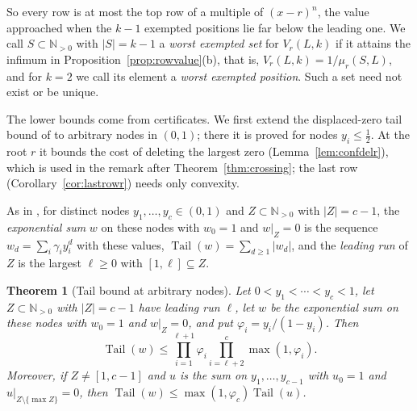 \documentclass[11pt]{article}
\newtheorem{theorem}{Theorem}[section]
\newcommand{\N}{\mathbb N}
\DeclareMathOperator{\Tail}{Tail}
\begin{document}
So every row is at most the top row of a multiple of $(x-r)^n$, the value
approached when the $k-1$ exempted positions lie far below the leading one.
We call $S\subset\N_{>0}$ with $|S|=k-1$ a \emph{worst exempted set} for
$V_r(L,k)$ if it attains the infimum in Proposition~\ref{prop:rowvalue}(b), that is,
$V_r(L,k)=1/\mu_r(S,L)$, and for $k=2$ we call its element a \emph{worst
exempted position}.  Such a set need not exist or be unique.

The lower bounds come from certificates.  We first extend the
displaced-zero tail bound of \cite{coefficient-mass} to arbitrary nodes
in $(0,1)$; there it is proved for nodes $y_i\le\frac12$.  At the root $r$
it bounds the cost of deleting the largest zero (Lemma~\ref{lem:confdelr}),
which is used in the remark after Theorem~\ref{thm:crossing}; the last row
(Corollary~\ref{cor:lastrowr}) needs only convexity.

As in \cite[Section~2]{coefficient-mass}, for distinct nodes
$y_1,\ldots,y_c\in(0,1)$ and $Z\subset\N_{>0}$ with $|Z|=c-1$, the
\emph{exponential sum} $w$ on these nodes with $w_0=1$ and $w|_Z=0$ is the
sequence $w_d=\sum_i\gamma_iy_i^d$ with these values, $\Tail(w)=\sum_{d\ge1}|w_d|$,
and the \emph{leading run} of $Z$ is the largest $\ell\ge0$ with
$[1,\ell]\subseteq Z$.

\begin{theorem}[Tail bound at arbitrary nodes]\label{thm:tailgen}
Let $0<y_1<\cdots<y_c<1$, let $Z\subset\N_{>0}$ with $|Z|=c-1$ have leading
run $\ell$, let $w$ be the exponential sum on these nodes with $w_0=1$ and
$w|_Z=0$, and put $\varphi_i=y_i/(1-y_i)$.  Then
\[
  \Tail(w)\le\prod_{i=1}^{\ell+1}\varphi_i\prod_{i=\ell+2}^c\max(1,\varphi_i).
\]
Moreover, if $Z\ne[1,c-1]$ and $u$ is the sum on $y_1,\ldots,y_{c-1}$ with
$u_0=1$ and $u|_{Z\setminus\{\max Z\}}=0$, then
$\Tail(w)\le\max(1,\varphi_c)\Tail(u)$.
\end{theorem}
\end{document}

